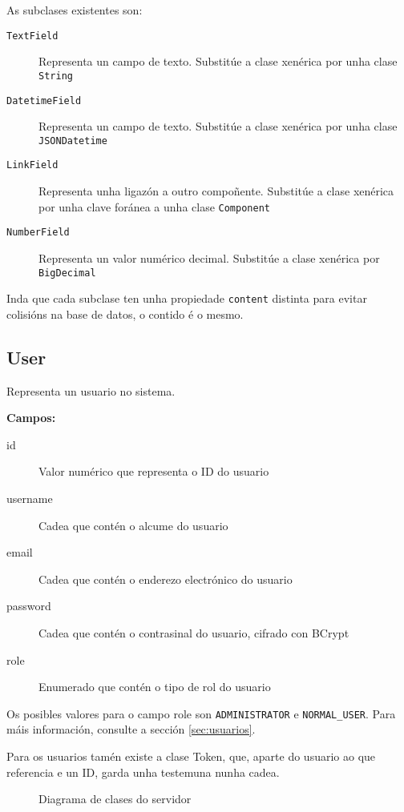 As subclases existentes son:

\begin{description}
    \item[\texttt{TextField}] Representa un campo de texto. Substitúe a clase xenérica por unha clase \texttt{String}
    \item[\texttt{DatetimeField}] Representa un campo de texto. Substitúe a clase xenérica por unha clase \texttt{JSONDatetime}
    \item[\texttt{LinkField}] Representa unha ligazón a outro compoñente.  Substitúe a clase xenérica por unha clave foránea a unha clase \texttt{Component}
    \item[\texttt{NumberField}] Representa un valor numérico decimal. Substitúe a clase xenérica por \texttt{BigDecimal}
\end{description}

Inda que cada subclase ten unha propiedade \texttt{content} distinta para evitar colisións na base de datos, o contido é o mesmo.

\subsection{User}
\label{obx:user}

Representa un usuario no sistema.

\textbf{Campos:}

\begin{description}
    \item[id] Valor numérico que representa o ID do usuario
    \item[username] Cadea que contén o alcume do usuario
    \item[email] Cadea que contén o enderezo electrónico do usuario
    \item[password] Cadea que contén o contrasinal do usuario, cifrado con \Gls{BCrypt}
    \item[role] Enumerado que contén o tipo de rol do usuario
\end{description}

Os posibles valores para o campo role son \texttt{ADMINISTRATOR} e \texttt{NORMAL\_USER}. Para máis información, consulte a sección \ref{sec:usuarios}.

Para os usuarios tamén existe a clase Token, que, aparte do usuario ao que referencia e un ID, garda unha \Gls{testemuna} nunha cadea.

\begin{figure}\hspace*{-3cm}
    \centering
    \resizebox{.9\textwidth}{!}{}
    \caption{Diagrama de clases do servidor}
    \label{fig:diagrama_clases}
\end{figure}

